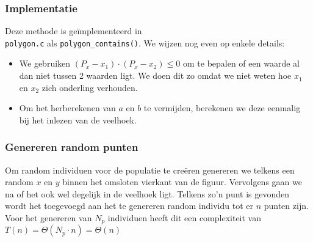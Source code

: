 
\subsubsection{Implementatie}
Deze methode is geïmplementeerd in \\ \texttt{polygon.c} als  \texttt{polygon\_contains()}. 
We wijzen nog even op enkele details:
\begin{itemize}
\item We gebruiken $(P_x-x_1)\cdot(P_x-x_2)\leq0$ om te bepalen of een waarde al dan niet 
		tussen 2 waarden ligt. We doen dit zo omdat we niet weten hoe $x_1$ en $x_2$ 
		zich onderling verhouden.
\item Om het herberekenen van $a$ en $b$ te vermijden, berekenen we deze eenmalig bij het inlezen van de veelhoek.
\end{itemize}

\subsubsection{Genereren random punten}
\label{ssub:rand_generation}
Om random individuen voor de populatie te creëren genereren we telkens een random $x$ en $y$ binnen het omsloten vierkant van de figuur. Vervolgens gaan we na of het ook wel degelijk in de veelhoek ligt. Telkens zo'n punt is gevonden wordt het toegevoegd aan het te genereren random individu tot er $n$ punten zijn. Voor het genereren van $N_p$ individuen heeft dit een complexiteit van $T(n)=\Theta(N_p\cdot n) = \Theta(n)$


 
